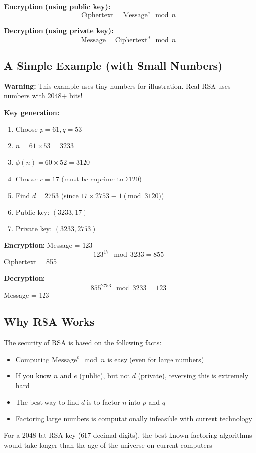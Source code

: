 \documentclass[11pt,a4paper]{report}
\begin{document}
\textbf{Encryption (using public key):}
\[ \text{Ciphertext} = \text{Message}^e \mod n \]

\textbf{Decryption (using private key):}
\[ \text{Message} = \text{Ciphertext}^d \mod n \]

\subsection{A Simple Example (with Small Numbers)}

\textbf{Warning:} This example uses tiny numbers for illustration. Real RSA uses numbers with 2048+ bits!

\textbf{Key generation:}
\begin{enumerate}
\item Choose $p = 61, q = 53$
\item $n = 61 \times 53 = 3233$
\item $\phi(n) = 60 \times 52 = 3120$
\item Choose $e = 17$ (must be coprime to 3120)
\item Find $d = 2753$ (since $17 \times 2753 \equiv 1 \pmod{3120}$)
\item Public key: $(3233, 17)$
\item Private key: $(3233, 2753)$
\end{enumerate}

\textbf{Encryption:} Message = 123
\[ 123^{17} \mod 3233 = 855 \]
Ciphertext = 855

\textbf{Decryption:}
\[ 855^{2753} \mod 3233 = 123 \]
Message = 123

\subsection{Why RSA Works}

The security of RSA is based on the following facts:
\begin{itemize}
\item Computing $\text{Message}^e \mod n$ is easy (even for large numbers)
\item If you know $n$ and $e$ (public), but not $d$ (private), reversing this is extremely hard
\item The best way to find $d$ is to factor $n$ into $p$ and $q$
\item Factoring large numbers is computationally infeasible with current technology
\end{itemize}

For a 2048-bit RSA key (617 decimal digits), the best known factoring algorithms would take longer than the age of the universe on current computers.
\end{document}
